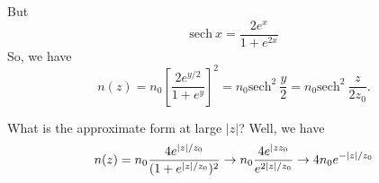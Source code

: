 \documentclass[]{article}
\begin{document}
\noindent
But
\begin{equation}
\mathrm{sech}~x= \frac{2e^x}{1+e^{2x}}
\end{equation}
\noindent
So, we have
\begin{equation}
n(z) = n_0 \left[\frac{2 e^{y/2}}{1+e^{y}}\right]^2 = n_0 \mathrm{sech}^{2}~\frac{y}{2} = n_0 \mathrm{sech}^2~\frac{z}{2 z_0}.
\end{equation}

What is the approximate form at large $|z|$?  Well, we have
\begin{equation}
n(z) = n_0 \frac{4 e^{|z|/z_0}}{(1+e^{|z|/z_0})^2}\to n_0\frac{4 e^{|z\/z_0}}{e^{2|z|/z_0}} \to 4 n_0 e^{-|z|/z_0}
\end{equation}
\end{document}
